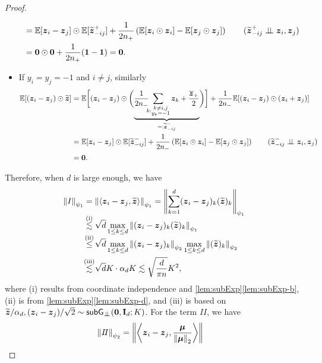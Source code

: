 \begin{proof}
\begin{itemize}
\begin{align*}
        & = \mathbb{E}[\text{\boldmath $z$}_i - \text{\boldmath $z$}_j] \odot \mathbb{E}[ \widetilde{\text{\boldmath $z$}}_{-ij}^+ ]
        + \frac{1}{2 n_+} \left( \mathbb{E}[\text{\boldmath $z$}_i \odot \text{\boldmath $z$}_i] - \mathbb{E}[\text{\boldmath $z$}_j \odot \text{\boldmath $z$}_j] \right) 
        \qquad (\widetilde{\text{\boldmath $z$}}_{-ij}^+  \perp\!\!\!\perp  \text{\boldmath $z$}_i, \text{\boldmath $z$}_j) \\
        & = \mathrm{\bf 0} \odot \mathrm{\bf 0} + \frac{1}{2 n_+} ( \mathrm{\bf 1} - \mathrm{\bf 1} ) = \mathrm{\bf 0}.
    \end{align*}
    \item If $y_i = y_j = -1$ and $i \not= j$, similarly
    \begin{align*}
        \mathbb{E}[ (\text{\boldmath $z$}_i - \text{\boldmath $z$}_j) \odot \widetilde{\text{\boldmath $z$}} ]
        & =  \mathbb{E}\biggl[(\text{\boldmath $z$}_i - \text{\boldmath $z$}_j) \odot 
        \biggl( \underbrace{  \frac1{2 n_-} \!\!\! \sum_{k: \substack{k \not= i, j \\ y_k = -1}} \text{\boldmath $z$}_k + \frac{\overline{\text{\boldmath $z$}}_+}2  }_{ =: \widetilde{\text{\boldmath $z$}}_{-ij}^- }
        \biggr)
        \biggr] 
        + \frac{1}{2 n_-} \mathbb{E}[ (\text{\boldmath $z$}_i - \text{\boldmath $z$}_j) \odot (\text{\boldmath $z$}_i + \text{\boldmath $z$}_j) ] \\
        & = \mathbb{E}[\text{\boldmath $z$}_i - \text{\boldmath $z$}_j] \odot \mathbb{E}[ \widetilde{\text{\boldmath $z$}}_{-ij}^- ]
        + \frac{1}{2 n_-} \left( \mathbb{E}[\text{\boldmath $z$}_i \odot \text{\boldmath $z$}_i] - \mathbb{E}[\text{\boldmath $z$}_j \odot \text{\boldmath $z$}_j] \right) 
        \qquad (\widetilde{\text{\boldmath $z$}}_{-ij}^-  \perp\!\!\!\perp  \text{\boldmath $z$}_i, \text{\boldmath $z$}_j) 
        \\
        & = \mathrm{\bf 0}.
    \end{align*}
\end{itemize}
Therefore, when $d$ is large enough, we have
\begin{align*}
    \norm{I}_{\psi_1} & = \norm{\< \zz_i - \zz_j, \wt\zz \>}_{\psi_1}
    = \norm{ \sum_{k=1}^d (\zz_i - \zz_j)_k (\wt\zz)_k }_{\psi_1} \\
    & \overset{\mathmakebox[0pt][c]{\smash{\text{(i)}}}}{\lesssim} \sqrt{d} \max_{1 \le k \le d} \norm{ (\zz_i - \zz_j)_k (\wt\zz)_k }_{\psi_1} \\
    & \overset{\mathmakebox[0pt][c]{\smash{\text{(ii)}}}}{\le} \sqrt{d} \max_{1 \le k \le d} \norm{ (\zz_i - \zz_j)_k }_{\psi_2}
    \max_{1 \le k \le d} \norm{ (\wt\zz)_k }_{\psi_2} \\
    & \overset{\mathmakebox[0pt][c]{\smash{\text{(iii)}}}}{\lesssim} \sqrt{d} K \cdot \alpha_{d} K 
    \lesssim \sqrt{\frac{d}{\pi n}} K^2,
\end{align*}
where (i) results from coordinate independence and \cref{lem:subExp}\ref{lem:subExp-b}, (ii) is from \cref{lem:subExp}\ref{lem:subExp-d}, and (iii) is based on $\widetilde{\text{\boldmath $z$}}/\alpha_{d} , (\text{\boldmath $z$}_i - \text{\boldmath $z$}_j)/\sqrt{2} \sim {\sf{subG}_{\perp\!\!\!\perp}}(\mathrm{\bf 0}, \mathrm{\bf I}_d; K)$. For the term $I\!I$, we have
\begin{align*}
    \left\|{I\!I}\right\|_{\psi_2} & = \left\|{\left\langle \text{\boldmath $z$}_i - \text{\boldmath $z$}_j, \frac{{\boldsymbol{\mu}}}{\left\|{{\boldsymbol{\mu}}}\right\|_2} \right\rangle
}\right\|
\end{align*}
\end{proof}
